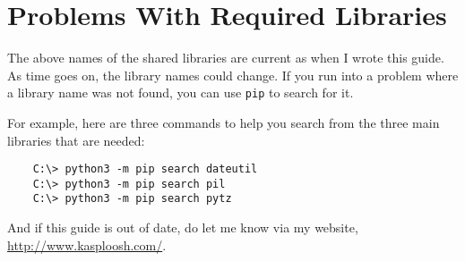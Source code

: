 \section{Problems With Required Libraries}

The above names of the shared libraries are current as when I wrote
this guide. As time goes on, the library names could change. If
you run into a problem where a library name was not found, you
can use \texttt{pip} to search for it.

For example, here are three commands to help you search from the
three main libraries that are needed:

\begin{verbatim}
    C:\> python3 -m pip search dateutil
    C:\> python3 -m pip search pil
    C:\> python3 -m pip search pytz
\end{verbatim}

And if this guide is out of date, do let me know via my website,
\url{http://www.kasploosh.com/}.

